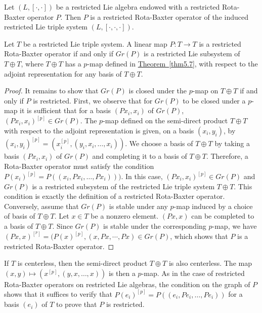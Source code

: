 \documentclass[11pt, twoside]{article}
\begin{document}
\begin{ex}
    Let $(L,[\cdot,\cdot])$ be a restricted Lie algebra endowed with a restricted Rota-Baxter operator $P$. Then $P$ is a restricted Rota-Baxter operator of the induced restricted Lie triple system $(L,[\cdot,\cdot,\cdot]) $.
\end{ex}

\begin{prop}\label{p5.8}   
    Let $T$ be a restricted Lie triple system. A linear map $P:T\to T$ is a restricted Rota-Baxter operator if and only if $Gr(P) $ is a restricted Lie subsystem of $T\oplus T$, where $T\oplus T $ has a $p$-map defined in  \hyperref[thm5.7]{Theorem~\ref*{thm5.7}}, with respect to the adjoint representation for any basis of $T\oplus T $. 
\end{prop}

\begin{proof}
    It remains to show that $Gr(P) $ is closed under the $p$-map on $T\oplus T $ if and only if $P$ is restricted. First, we observe that for $Gr(P) $ to be closed under a $p$-map it is sufficient that for a basis $(Px_i,x_i) $ of $Gr(P)$, $(Px_i,x_i)^{[p]}\in Gr(P) $. The $p$-map defined on the semi-direct product $T\oplus T$ with respect to the adjoint representation is given, on a basis $(x_i,y_i) $, by $(x_i,y_i)^{[p]}=(x_i^{[p]},(y_i,x_i,\ldots,x_i)) $. We  choose a basis of $T\oplus T$ by taking a basis $(Px_i,x_i) $ of $Gr(P)$ and completing it to a basis of $T\oplus T$. Therefore, a Rota-Baxter operator must satisfy the condition $P(x_i)^{[p]}=P((x_i,Px_i,\ldots,Px_i))) $. In this case, $(Px_i,x_i)^{[p]}\in Gr(P)$ and $Gr(P) $ is a restricted subsystem of the restricted Lie triple system $T\oplus T$. This condition is exactly the definition of a restricted Rota-Baxter operator. Conversely, assume that $Gr(P) $ is stable under any $p$-map induced by a choice of basis of $T\oplus T$. Let $x\in T$ be a nonzero element. $(Px,x) $ can be completed to a basis of $T\oplus T $. Since $Gr(P)$ is stable under the corresponding $p$-map, we have $(Px,x)^{[^p]}=(P(x)^{[p]},(x,Px,\cdots,Px)\in Gr(P) $, which shows that $P $ is a restricted Rota-Baxter operator.
\end{proof}

\begin{rmq} If $T$ is centerless, then the semi-direct product $T\oplus T$ is also centerless. The map $(x,y)\mapsto (x^{[p]},(y,x,\ldots,x)) $ is then a $p$-map. 
   As in the case of restricted Rota-Baxter operators on restricted Lie algebras, the condition on the graph of $P$ shows that it suffices to verify that $P(e_i)^{[p]}=P((e_i,Pe_i,\ldots, Pe_i)) $ for a basis $(e_i)$ of $T$ to prove that $P$ is restricted.
\end{rmq}
\end{document}
